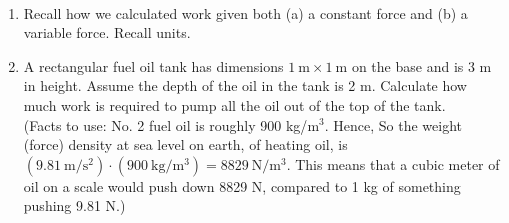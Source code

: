 \documentclass[11pt,fleqn]{article}
\begin{document}
\renewcommand{\headrulewidth}{0pt}
\newcommand{\blank}[1]{\rule{#1}{0.75pt}}
\newcommand{\bc}{\begin{center}}
\newcommand{\ec}{\end{center}}
\renewcommand{\d}{\displaystyle}

\vspace*{-0.7in}

\begin{center}
  \large
  \\
   
\end{center}

\begin{enumerate}
\item Recall how we calculated work given both (a) a constant force and (b) a variable force. Recall units.

\vspace{1in}

\item A rectangular fuel oil tank has dimensions $1\: \text{m} \times 1 \: \text{m}$ on the base and is 3 m in height. Assume the depth of the oil in the tank is 2 m. Calculate how much work is required to pump all the oil out of the top of the tank.\\

 (Facts to use: No. 2 fuel oil is roughly 900 kg/$\text{m}^3$. Hence, So the weight (force) density at sea level on earth, of heating oil, is $(9.81\: \text{m}/\text{s}^2) \cdot (900 \:\text{kg}/\text{m}^3) = 8829 \:\text{N}/\text{m}^3.$ This means that a cubic meter of oil on a scale would push down 8829 N, compared to 1 kg of something pushing 9.81 N.)
 \vfill

\end{enumerate}
\end{document}

